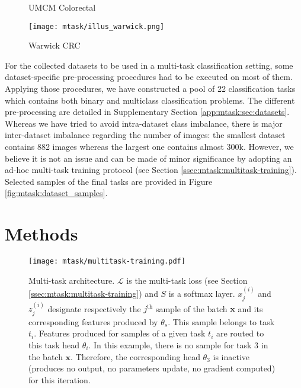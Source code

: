 \begin{figure*}
\begin{subfigure}[t]{0.115\textwidth}
        \caption{UMCM Colorectal}
    \end{subfigure}
    \begin{subfigure}[t]{0.115\textwidth}
        \centering
        \texttt{[image: mtask/illus\_warwick.png]}
        \caption{Warwick CRC}
    \end{subfigure}
    \caption{Overview of our final classification tasks (the display size does not reflect actual image size). In this figure, we provide only one set of selected samples for Breast1 and Breast2 as their corresponding tasks are similar and they originate both from the same set of WSIs.}
    \label{fig:mtask:dataset_samples}
\end{figure*}

For the collected datasets to be used in a multi-task classification setting, some dataset-specific pre-processing procedures had to be executed on most of them. Applying those procedures, we have constructed a pool of 22 classification tasks which contains both binary and multiclass classification problems. The different pre-processing are detailed in Supplementary Section \ref{app:mtask:sec:datasets}. Whereas we have tried to avoid intra-dataset class imbalance, there is major inter-dataset imbalance regarding the number of images: the smallest dataset contains 882 images whereas the largest one contains almost 300k. However, we believe it is not an issue and can be made of minor significance by adopting an ad-hoc multi-task training protocol (see Section \ref{ssec:mtask:multitask-training}). Selected samples of the final tasks are provided in Figure \ref{fig:mtask:dataset_samples}. 

\section{Methods}
\label{sec:mtask:methods}

\begin{figure}
    \centering
    \texttt{[image: mtask/multitask-training.pdf]}
    \caption{Multi-task architecture. $\mathcal{L}$ is the multi-task loss (see Section \ref{ssec:mtask:multitask-training}) and $S$ is a softmax layer. $x_j^{(i)}$ and $z_j^{(i)}$ designate respectively the $j^{\text{th}}$ sample of the batch $\mathbf{x}$ and its corresponding features produced by $\theta_s$. This sample belongs to task $t_i$. Features produced for samples of a given task $t_i$ are routed to this task head $\theta_i$. In this example, there is no sample for task 3 in the batch $\mathbf{x}$. Therefore, the corresponding head $\theta_3$ is inactive (\ie produces no output, no parameters update, no gradient computed) for this iteration.}
    \label{fig:mtask:multitask-training}
\end{figure}

